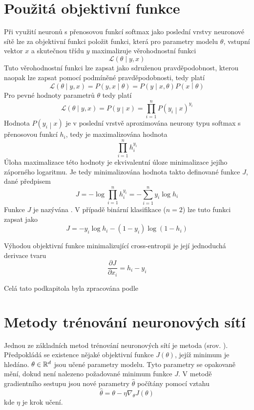 \section{Použitá objektivní funkce}\label{loss_function}
Při využití neuronů s přenosovou funkcí softmax jako poslední vrstvy neuronové sítě lze za objektivní funkci položit funkci, která pro parametry modelu \( \theta \), vstupní vektor \( x \) a skutečnou třídu \( y \) maximalizuje věrohodnostní funkci
\[ \mathcal L \left( \theta \middle| y, x \right) \]
Tuto věrohodnostní funkci lze zapsat jako sdruženou pravděpodobnost, kterou naopak lze zapsat pomocí podmíněné pravděpodobnosti, tedy platí
\[ \mathcal L \left( \theta \middle| y, x \right) = P \left( y, x \middle| \theta \right) = P \left( y \middle| x, \theta \right) P \left( x \middle| \theta \right) \]
Pro pevné hodnoty parametrů \( \theta \) tedy platí
\[ \mathcal L \left( \theta \middle| y, x \right) = P \left( y \middle| x \right) = \prod_{i = 1}^n P \left( y_i \middle| x \right)^{y_i} \]
Hodnota \( P \left( y_i \middle| x \right) \) je v poslední vrstvě aproximována neurony typu softmax s přenosovou funkcí \( h_i \), tedy je maximalizována hodnota
\[ \prod_{i = 1}^n h_i^{y_i} \]
Úloha maximalizace této hodnoty je ekvivalentní úloze minimalizace jejího záporného logaritmu. Je tedy minimalizována hodnota takto definované funkce \( J \), dané předpisem
\[ J = -\log \prod_{i = 1}^n h_i^{y_i} = -\sum_{i = 1}^n y_i \log h_i \]
Funkce \( J \) je nazývána . V případě binární klasifikace (\( n = 2 \)) lze tuto funkci zapsat jako 
\[ J = - y_i \log h_i - \left( 1 - y_i \right) \log \left( 1 - h_i \right) \]

Výhodou objektivní funkce minimalizující cross-entropii je její jednoduchá derivace tvaru
\[ \frac{\partial J}{\partial x_i} = h_i - y_i \]

Celá tato podkapitola byla zpracována podle \cite{roelants_how_2017}

\section{Metody trénování neuronových sítí}
Jednou ze základních metod trénování neuronových sítí je metoda  (srov. \cite{cauchy_methode_1847}). Předpokládá se existence nějaké objektivní funkce \( J \left( \theta \right) \), jejíž minimum je hledáno. \( \theta \in \mathbb R^d \) jsou učené parametry modelu. Tyto parametry se opakovaně mění, dokud není nalezeno požadované minimum funkce \( J \). V metodě gradientního sestupu jsou nové parametry \( \hat \theta \) počítány pomocí vztahu
\[ \hat \theta = \theta - \eta \nabla_{\theta} J \left( \theta \right) \]
kde \( \eta \) je krok učení.


